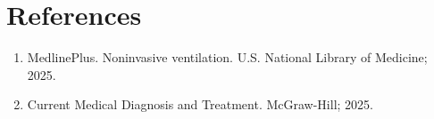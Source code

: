 \section*{References}
\begin{enumerate}
  \item MedlinePlus. Noninvasive ventilation. U.S. National Library of Medicine; 2025.
  \item Current Medical Diagnosis and Treatment. McGraw-Hill; 2025.
\end{enumerate}

\clearpage
